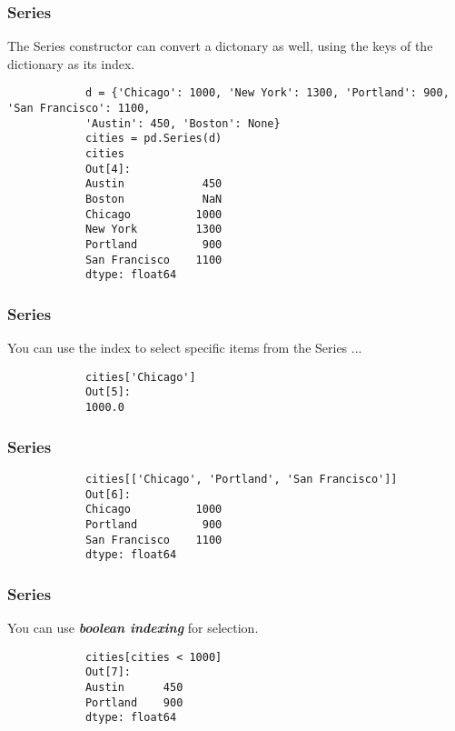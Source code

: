 \documentclass[KSmainSlides.tex]{subfiles}
\begin{document}
	\begin{frame}[fragile]
		\frametitle{Series}		
		The Series constructor can convert a dictonary as well, using the keys of the dictionary as its index.
		
		\begin{framed}
			\begin{verbatim}
			d = {'Chicago': 1000, 'New York': 1300, 'Portland': 900, 'San Francisco': 1100,
			'Austin': 450, 'Boston': None}
			cities = pd.Series(d)
			cities
			Out[4]:
			Austin            450
			Boston            NaN
			Chicago          1000
			New York         1300
			Portland          900
			San Francisco    1100
			dtype: float64
			\end{verbatim}
		\end{framed}
	\end{frame}
	\begin{frame}[fragile]
		\frametitle{Series}		
		You can use the index to select specific items from the Series ...
		
		\begin{framed}
			\begin{verbatim}
			cities['Chicago']
			Out[5]:
			1000.0
			\end{verbatim}
		\end{framed}
	\end{frame}
	\begin{frame}[fragile]
		\frametitle{Series}		
		\begin{framed}
			\begin{verbatim}
			cities[['Chicago', 'Portland', 'San Francisco']]
			Out[6]:
			Chicago          1000
			Portland          900
			San Francisco    1100
			dtype: float64
			\end{verbatim}
		\end{framed}
	\end{frame}
	\begin{frame}[fragile]
		\frametitle{Series}		
		You can use \textbf{\textit{boolean indexing}} for selection.
		
		\begin{framed}
			\begin{verbatim}
			cities[cities < 1000]
			Out[7]:
			Austin      450
			Portland    900
			dtype: float64
			\end{verbatim}
		\end{framed}
	\end{frame}
\end{document}
